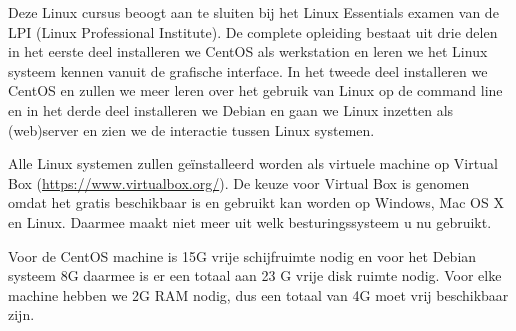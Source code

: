 Deze Linux cursus beoogt aan te sluiten bij het Linux Essentials examen van de LPI (Linux Professional Institute). De complete opleiding bestaat uit drie delen in het eerste deel installeren we CentOS als werkstation en leren we het Linux systeem kennen vanuit de grafische interface. In het tweede deel installeren we CentOS en zullen we meer leren over het gebruik van Linux op de command line en in het derde deel installeren we Debian en gaan we Linux inzetten als (web)server en zien we de interactie tussen Linux systemen.\par
Alle Linux systemen zullen ge\"installeerd worden als virtuele machine op Virtual Box (\url{https://www.virtualbox.org/}). De keuze voor Virtual Box is genomen omdat het gratis beschikbaar is en gebruikt kan worden op Windows, Mac OS X en Linux. Daarmee maakt niet meer uit welk besturingssysteem u nu gebruikt.

Voor de CentOS machine is 15G vrije schijfruimte nodig en voor het Debian systeem 8G daarmee is er een totaal aan 23 G vrije disk ruimte nodig. Voor elke machine hebben we 2G RAM nodig, dus een totaal van 4G moet vrij beschikbaar zijn.
